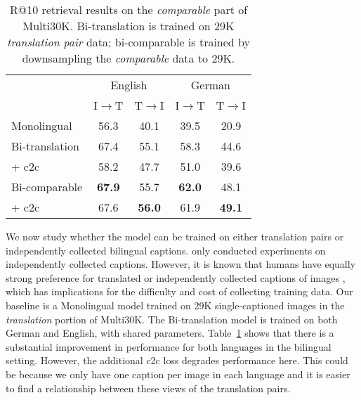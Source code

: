 \begin{table}[t]
\centering
\renewcommand{\arraystretch}{1.3}
\begin{tabular}{lcccc}
\toprule
& \multicolumn{2}{c}{English} &  \multicolumn{2}{c}{German} \\
 & I$\rightarrow$T & T$\rightarrow$I & I$\rightarrow$T & T$\rightarrow$I \\
\midrule
Monolingual			& 56.3 & 40.1 & 39.5 &  20.9\\
\midrule
Bi-translation 			& 67.4 &  55.1 & 58.3 & 44.6 \\
+ c2c     & 58.2 & 47.7 & 51.0 & 39.6\\
\midrule
Bi-comparable        & {\bf 67.9} & 55.7 & {\bf 62.0} & 48.1\\
+ c2c  & 67.6 & {\bf 56.0} & 61.9 & {\bf 49.1} \\
\bottomrule
\end{tabular}
\label{tab:bilingual}
\caption{R@10 retrieval results on the \emph{comparable} part of Multi30K. Bi-translation is trained on 29K \emph{translation pair} data; bi-comparable is trained by downsampling the \emph{comparable} data to 29K.
}
\label{tab:bitrans}
\end{table}
We now study whether the model can be trained on either translation pairs or independently collected bilingual captions. \citep{gella2017image} only conducted experiments on independently collected captions. However, it is known that humans have equally strong preference for translated or independently collected captions of images \cite{frank_elliott_specia_2018}, which has implications for the difficulty and cost of collecting training data. Our baseline is a Monolingual model trained on 29K single-captioned images in the {\it translation} portion of Multi30K. The Bi-translation model is trained on both German and English, with shared parameters. Table~\ref{tab:bitrans} shows that there is a substantial improvement in performance for both languages in the bilingual setting. However, the additional c2c loss degrades performance here. This could be because we only have one caption per image in each language and it is easier to find a relationship between these views of the translation pairs.

